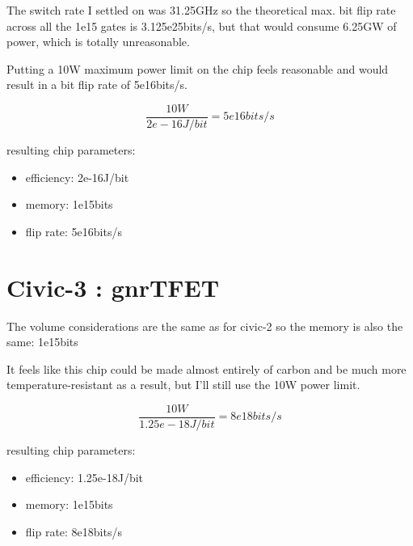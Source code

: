 \documentclass[a4paper]{article}
\begin{document}
	\medskip
	
	The switch rate I settled on was 31.25GHz so the theoretical max. bit flip rate across all the 1e15 gates is 3.125e25bits/s, but that would consume 6.25GW of power, which is totally unreasonable.
	
	\medskip
	
	Putting a 10W maximum power limit on the chip feels reasonable and would result in a bit flip rate of 5e16bits/s.
	
	$$ \frac{10W}{2e-16J/bit} = 5e16bits/s $$
	
	resulting chip parameters:
	
	\begin{itemize}
		\item efficiency: 2e-16J/bit
		
		\item memory: 1e15bits
		
		\item flip rate: 5e16bits/s
	\end{itemize}
	
	\section{Civic-3 : gnrTFET}
	
	The volume considerations are the same as for civic-2 so the memory is also the same: 1e15bits
	
	\medskip
	
	It feels like this chip could be made almost entirely of carbon and be much more temperature-resistant as a result, but I'll still use the 10W power limit.
	
	$$ \frac{10W}{1.25e-18J/bit} = 8e18bits/s$$
	
	resulting chip parameters:
	
	\begin{itemize}
		\item efficiency: 1.25e-18J/bit
		
		\item memory: 1e15bits
		
		\item flip rate: 8e18bits/s
	\end{itemize}
	
	\pagebreak
	
\end{document}
